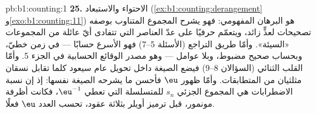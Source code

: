 \begin{solution}{pb:b1:counting:1}
\textbf{25.} الاحتواء والاستبعاد
(\cref{ex:b1:counting:derangement} و\cref{exo:b1:counting:11})
هو البرهان المفهومي: فهو يشرح المجموع المتناوب بوصفه تصحيحات
لعدٍّ زائد، ويتعمّم حرفيًا على عدّ العناصر التي تتفادى أيّ عائلة
من المجموعات «السيئة». وأمّا طريق التراجع
(الأسئلة 5--7) فهو الأسرع حسابًا --- في زمن خطيّ، وبحساب صحيح
مضبوط، وبلا عوامل --- وهو مصدر الوقائع الحسابية في الجزء 5.
وأمّا القلب الثنائي (السؤالان 8--9) فيضع الصيغة داخل تحويل
عام سيعود كلما تقابل نسقان مثلثيان من المتطابقات. وأمّا
ظهور $\eu$ فأحسن ما يشرحه الصيغة نفسها: إذ إن نسبة
الاضطرابات هي المجموع الجزئي $s_n$ للمتسلسلة التي تعطي
$\eu^{-1}$، فكانت أظرفة مونمور، قبل ترميز أويلر بثلاثة عقود،
تحسب العدد $\eu$ فعلًا.
\end{solution}
